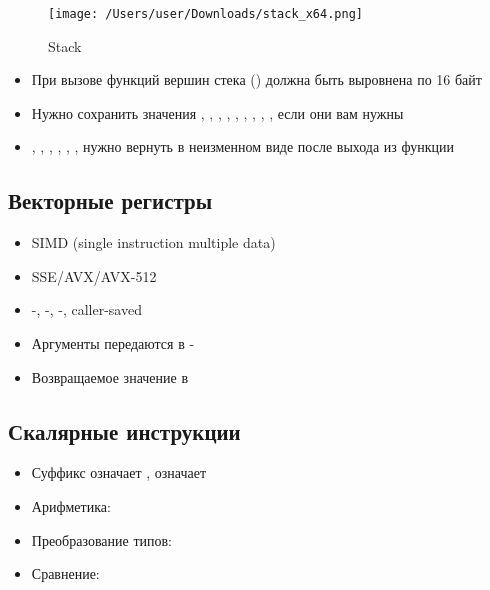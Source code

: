 \begin{figure}[H]
  \centering
  \texttt{[image: /Users/user/Downloads/stack\_x64.png]}
  \caption{Stack}
  \label{fig:stack}
\end{figure}

    \begin{itemize}
      \item При вызове функций вершин стека () должна быть выровнена по 16 байт
      \item Нужно сохранить значения , , , , , , , , , если они вам нужны
      \item {}, , , , , ,  нужно вернуть в неизменном виде после выхода из функции
    \end{itemize}
  
  \subsection{Векторные регистры}
    \begin{itemize}
      \item SIMD (single instruction multiple data)
      \item SSE/AVX/AVX-512
      \item {}-, -, -, caller-saved
      \item Аргументы передаются в -
      \item Возвращаемое значение в 
    \end{itemize}
  
  \subsection{Скалярные инструкции}
    \begin{itemize}
      \item Суффикс  означает ,  означает 
      \item Арифметика: 
      \item Преобразование типов: 
      \item Сравнение: 
    \end{itemize}
  
